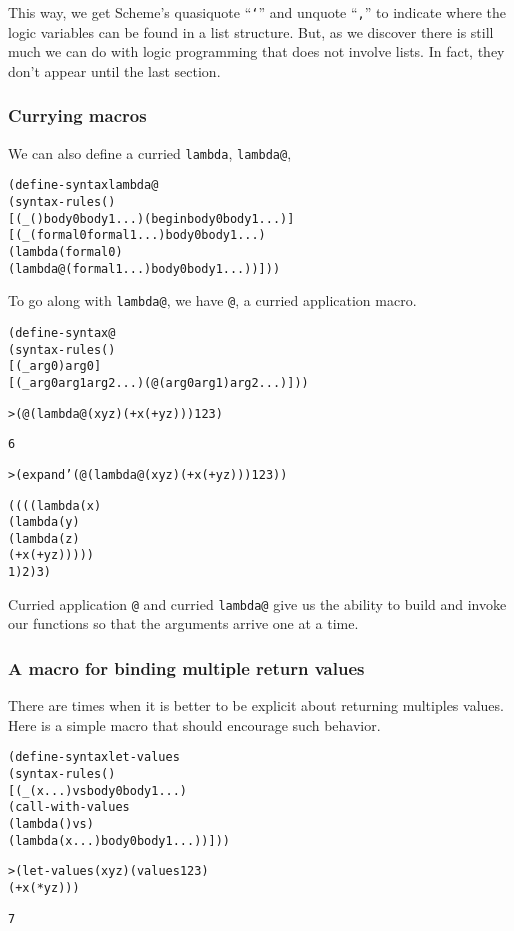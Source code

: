 This way, we get Scheme's quasiquote ``\texttt{`}'' and unquote
``\texttt{,}'' to indicate where the logic variables can be found in a
list structure.  But, as we discover there is still much we can do
with logic programming that does not involve lists.  In fact, they
don't appear until the last section.

\subsubsection{Currying macros}

We can also define a curried \texttt{lambda}, \texttt{lambda@},

\begin{alltt}
(define-syntax lambda@
  (syntax-rules ()
    [(_ () body0 body1 ...) (begin body0 body1 ...)]
    [(_ (formal0 formal1 ...) body0 body1 ...)
     (lambda (formal0)
       (lambda@ (formal1 ...) body0 body1 ...))]))
\end{alltt}

To go along with \texttt{lambda@}, we have \texttt{@}, a curried
application macro.

\begin{alltt}
(define-syntax @    
  (syntax-rules ()
    [(_ arg0) arg0]
    [(_ arg0 arg1 arg2 ...) (@ (arg0 arg1) arg2 ...)]))
\end{alltt}

\begin{alltt}
> (@ (lambda@ (x y z) (+ x (+ y z))) 1 2 3)

6

> (expand '(@ (lambda@ (x y z) (+ x (+ y z))) 1 2 3))

((((lambda (x)
     (lambda (y)
       (lambda (z)
         (+ x (+ y z)))))
   1) 2) 3)
\end{alltt}

Curried application \texttt{@} and curried \texttt{lambda@} give us
the ability to build and invoke our functions so that the arguments
arrive one at a time.

\subsubsection{A macro for binding multiple return values}

There are times when it is better to be explicit about returning
multiples values.  Here is a simple macro that should encourage
such behavior.

\begin{alltt}
(define-syntax let-values
  (syntax-rules ()
    [(_ (x ...) vs body0 body1 ...)
     (call-with-values 
       (lambda () vs)
       (lambda (x ...) body0 body1 ...))]))

> (let-values (x y z) (values 1 2 3) 
    (+ x (* y z)))

7
\end{alltt}

